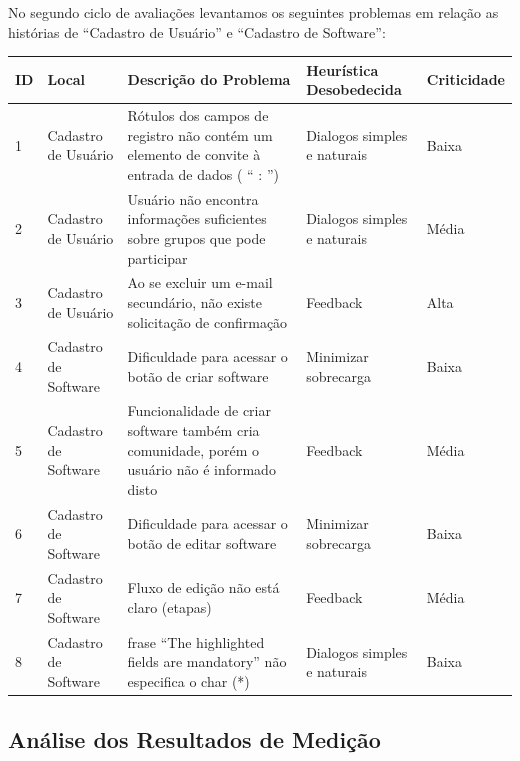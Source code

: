 No segundo ciclo de avaliações levantamos os seguintes problemas em relação as histórias de ``Cadastro de Usuário'' e ``Cadastro de Software'':

\begin{table}[d]
\begin{tabular}{|l|p{3cm}|p{6cm}|p{3cm}|l|}
\hline
\textbf{ID} & \textbf{Local} & \textbf{Descrição do Problema}                                                                                     & \textbf{Heurística Desobedecida} & \textbf{Criticidade} \\ \hline
1           & Cadastro de Usuário                 & Rótulos dos campos de registro não contém um elemento de convite à entrada de dados ( “ : ”) & Dialogos simples e naturais     & Baixa                \\ \hline
2           & Cadastro de Usuário                 & Usuário não encontra informações suficientes sobre grupos que pode participar  & Dialogos simples e naturais             & Média                \\ \hline
3           & Cadastro de Usuário               & Ao se excluir um e-mail secundário, não existe solicitação de confirmação       & Feedback                & Alta                \\ \hline
4           & Cadastro de Software      & Dificuldade para acessar o botão de criar software
	        & Minimizar sobrecarga          & Baixa                \\ \hline
5           & Cadastro de Software       & Funcionalidade de criar software também cria comunidade, porém o usuário não é informado disto  & Feedback    & Média                \\ \hline
6           & Cadastro de Software    & Dificuldade para acessar o botão de editar software
		    & Minimizar sobrecarga           & Baixa                \\ \hline
7           & Cadastro de Software    & Fluxo de edição não está claro (etapas)
			& Feedback                       & Média                \\ \hline
8           & Cadastro de Software    & frase ``The highlighted fields are mandatory'' não especifica o char (*)
		    &Dialogos simples e naturais     & Baixa                \\ \hline
\end{tabular}
\end{table}

 




\subsection{Análise dos Resultados de Medição}


